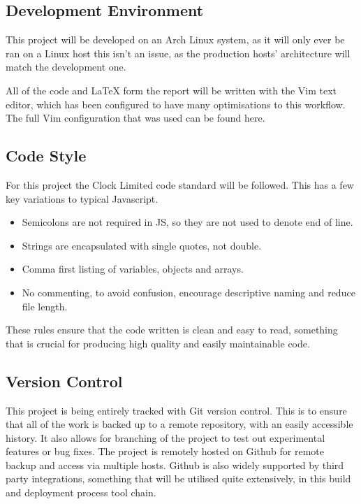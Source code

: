   \subsection{Development Environment}
    This project will be developed on an Arch Linux system, as it will only ever be ran on a Linux host this isn't an issue, as the production hosts' architecture will match the development one. 

    All of the code and LaTeX form the report will be written with the Vim text editor, which has been configured to have many optimisations to this workflow. The full Vim configuration that was used can be found here\cite{vimrc}.

  \subsection{Code Style}
  For this project the Clock Limited code standard\cite{clockstandard} will be followed. This has a few key variations to typical Javascript. 

  \begin{itemize}
    \item Semicolons are not required in JS, so they are not used to denote end of line.
    \item Strings are encapsulated with single quotes, not double. 
    \item Comma first\cite{commafirst} listing of variables, objects and arrays.
    \item No commenting, to avoid confusion, encourage descriptive naming and reduce file length.
  \end{itemize}

  These rules ensure that the code written is clean and easy to read, something that is crucial for producing high quality and easily maintainable code. 

  \subsection{Version Control}
    This project is being entirely tracked with Git version control. This is to ensure that all of the work is backed up to a remote repository, with an easily accessible history. It also allows for branching of the project to test out experimental features or bug fixes. The project is remotely hosted on Github\cite{github} for remote backup and access via multiple hosts. Github is also widely supported by third party integrations, something that will be utilised quite extensively, in this build and deployment process tool chain.


